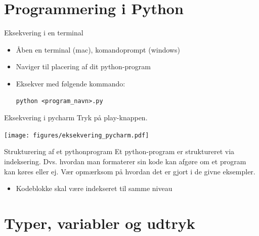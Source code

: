 \documentclass[10pt]{beamer}
\begin{document}
\section{Programmering i Python}

\begin{frame}[fragile]{Eksekvering i en terminal}
	\begin{itemize}
		\item Åben en terminal (mac), komandoprompt (windows)
		\item Naviger til placering af dit python-program
		\item Eksekver med følgende kommando:
		\begin{lstlisting}[style=terminal]
python <program_navn>.py
		\end{lstlisting}
	\end{itemize}
	
\end{frame}

\begin{frame}{Eksekvering i pycharm}
	Tryk på play-knappen.
			\begin{center}
				\texttt{[image: figures/eksekvering\_pycharm.pdf]}
			\end{center}
\end{frame}


\begin{frame}{Strukturering af et pythonprogram}
	Et python-program er struktureret via indeksering. Dvs. hvordan man formaterer sin kode kan afgøre om et program kan køres eller ej. Vær opmærksom på hvordan det er gjort i de givne eksempler.
	\begin{itemize}
		\item Kodeblokke skal være indekseret til samme niveau
	\end{itemize}
\end{frame}

\section{Typer, variabler og udtryk}
\end{document}
